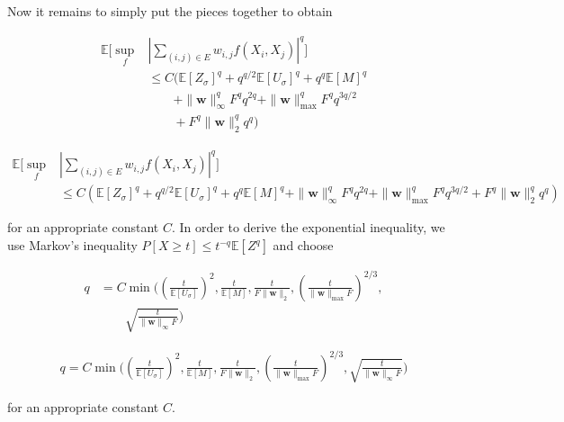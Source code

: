 \documentclass[letterpaper]{article} %
\def\DoubleColumn{}
\def\DoubleColumnEnd{}
\def\SingleColumn{}
\def\SingleColumnEnd{}
\newcommand{\E}{\mathbb{E}}
\newcommand{\Pro}{P}
\newcommand{\weight}{\mathbf{w}}
\newcommand{\rademacher}{\sigma}
\newcommand{\pair}[1]{(#1)}
\begin{document}
Now it remains to simply put the pieces together to obtain
\DoubleColumn
\begin{align*}
\E[\sup_f&|\sum_{\pair{i,j}\in E}w_{i,j} f(X_i,X_j)|^q]\\
&\le C(\E[Z_\rademacher]^q+q^{q/2}\E[U_\rademacher]^q+q^q\E[M]^q\\
&\qquad+\|\weight{}\|_\infty^q F^qq^{2q}+\|\weight{}\|_{\max}^qF^qq^{3q/2}\\
&\qquad+F^q\|\weight{}\|_2^qq^q)
\end{align*}
\DoubleColumnEnd
\SingleColumn
\begin{align*}
\E[\sup_f&|\sum_{\pair{i,j}\in E}w_{i,j} f(X_i,X_j)|^q]\\
&\le C(\E[Z_\rademacher]^q+q^{q/2}\E[U_\rademacher]^q+q^q\E[M]^q+\|\weight{}\|_\infty^q F^qq^{2q}+\|\weight{}\|_{\max}^qF^qq^{3q/2}+F^q\|\weight{}\|_2^qq^q)
\end{align*}
\SingleColumnEnd
for an appropriate constant $C$. 
In order to derive the exponential inequality, we use Markov's inequality $\Pro[X\ge t]\le t^{-q}\E[Z^q]$ and choose
\DoubleColumn
\begin{align*}
    q&=C\min\Big((\frac{t}{\E[U_\rademacher]})^2,\frac{t}{\E[M]},\frac{t}{F\|\weight{}\|_2},(\frac{t}{\|\weight{}\|_{\max} F})^{2/3},\\
    &\qquad\sqrt{\frac{t}{\|\weight{}\|_\infty F}}\Big)
\end{align*}
\DoubleColumnEnd
\SingleColumn
\begin{align*}
    q=C\min\Big((\frac{t}{\E[U_\rademacher]})^2,\frac{t}{\E[M]},\frac{t}{F\|\weight{}\|_2},(\frac{t}{\|\weight{}\|_{\max} F})^{2/3},\sqrt{\frac{t}{\|\weight{}\|_\infty F}}\Big)
\end{align*}
\SingleColumnEnd
for an appropriate constant $C$.

\end{document}
